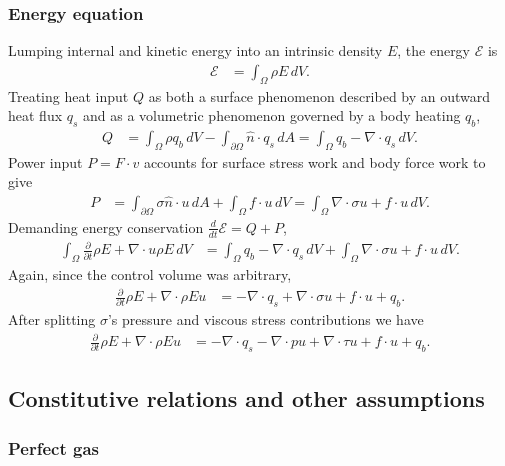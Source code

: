 \documentclass[letterpaper,11pt,nointlimits,reqno,draft]{amsart}
\begin{document}
\subsubsection{Energy equation}
Lumping internal and kinetic energy into an intrinsic density $E$,
the energy $\mathscr{E}$ is
\begin{align}
  \mathscr{E} &= \int_{\Omega} \rho{}E \, dV
  .
\end{align}
Treating heat input $Q$ as both a surface phenomenon described by an outward
heat flux $q_{s}$ and as a volumetric phenomenon governed by a
body heating $q_{b}$,
\begin{align}
  Q
  &=
   \int_{\Omega}\rho{}q_{b}\,dV
  -\int_{\partial\Omega}\hat{n}\cdot{}q_{s}\,dA
  =
    \int_{\Omega}q_{b} - \nabla\cdot{}q_{s}\,dV
  .
\end{align}
Power input $P=F\cdot{}v$ accounts for surface stress work and body
force work to give
\begin{align}
  P
  &=
    \int_{\partial\Omega} \sigma{}\hat{n} \cdot{} u \, dA
  + \int_{\Omega} f \cdot{} u \, dV
  = \int_{\Omega} \nabla\cdot{}\sigma{}u + f \cdot{} u \, dV
  .
\end{align}
Demanding energy conservation $\frac{d}{dt}\mathscr{E}=Q+P$,
\begin{align}
  \int_{\Omega}\frac{\partial}{\partial{}t} \rho{}E
  +
  \nabla\cdot{}u\rho{}E
  \,dV
&=
    \int_{\Omega} q_{b} - \nabla\cdot{}q_{s}\,dV
  + \int_{\Omega} \nabla\cdot\sigma{}u + f \cdot{} u \, dV
  .
\end{align}
Again, since the control volume was arbitrary,
\begin{align}
  \frac{\partial}{\partial{}t} \rho{}E
  +
  \nabla\cdot{}\rho{}Eu
&=
  - \nabla\cdot{}q_{s}
  + \nabla\cdot\sigma{}u
  + f \cdot{} u
  + q_{b}
  .
\end{align}
After splitting $\sigma$'s pressure and viscous stress contributions we have
\begin{align}
  \label{eq:cons_energy}
  \frac{\partial}{\partial{}t} \rho{}E
  +
  \nabla\cdot{}\rho{}Eu
&=
  - \nabla\cdot{}q_{s}
  - \nabla\cdot{}pu
  + \nabla\cdot{}\tau{}u
  + f \cdot{} u
  + q_{b}
  .
\end{align}

\subsection{Constitutive relations and other assumptions}
\label{sec:constitutive}

\subsubsection{Perfect gas}
\end{document}
